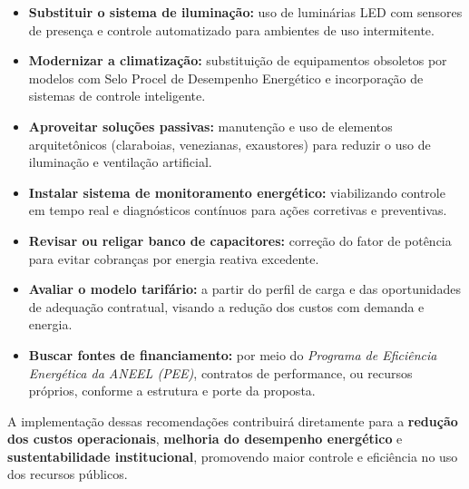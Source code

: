\begin{itemize}
    \item \textbf{Substituir o sistema de iluminação:} uso de luminárias LED com sensores de presença e controle automatizado para ambientes de uso intermitente.

    \item \textbf{Modernizar a climatização:} substituição de equipamentos obsoletos por modelos com Selo Procel de Desempenho Energético e incorporação de sistemas de controle inteligente.

    \item \textbf{Aproveitar soluções passivas:} manutenção e uso de elementos arquitetônicos (claraboias, venezianas, exaustores) para reduzir o uso de iluminação e ventilação artificial.

    \item \textbf{Instalar sistema de monitoramento energético:} viabilizando controle em tempo real e diagnósticos contínuos para ações corretivas e preventivas.

    \item \textbf{Revisar ou religar banco de capacitores:} correção do fator de potência para evitar cobranças por energia reativa excedente.

    \item \textbf{Avaliar o modelo tarifário:} a partir do perfil de carga e das oportunidades de adequação contratual, visando a redução dos custos com demanda e energia.

    \item \textbf{Buscar fontes de financiamento:} por meio do \textit{Programa de Eficiência Energética da ANEEL (PEE)}, contratos de performance, ou recursos próprios, conforme a estrutura e porte da proposta.
\end{itemize}

A implementação dessas recomendações contribuirá diretamente para a \textbf{redução dos custos operacionais}, \textbf{melhoria do desempenho energético} e \textbf{sustentabilidade institucional}, promovendo maior controle e eficiência no uso dos recursos públicos.

